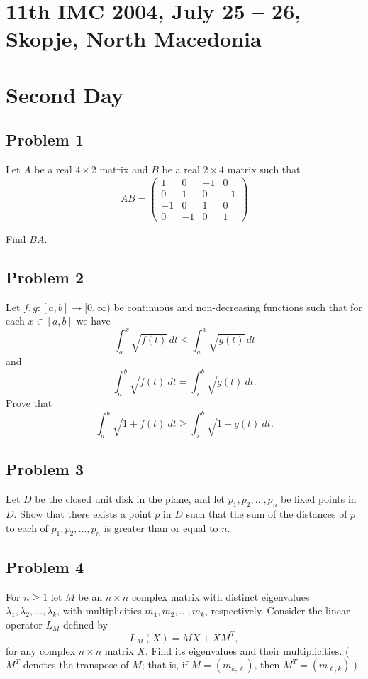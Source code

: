 \documentclass{article}
\begin{document}
\pagestyle{plain}

\section*{11th IMC 2004, July 25 -- 26, Skopje, North Macedonia}

\section*{Second Day}

\subsection*{Problem 1}
Let $A$ be a real $4 \times 2$ matrix and $B$ be a real $2 \times 4$ matrix such that
\[
AB = \begin{pmatrix}
1 & 0 & -1 & 0 \\
0 & 1 & 0 & -1 \\
-1 & 0 & 1 & 0 \\
0 & -1 & 0 & 1
\end{pmatrix}
\]

Find $BA$.

\subsection*{Problem 2}
Let $f, g \colon [a,b] \to [0, \infty)$ be continuous and non-decreasing functions
such that for each $x \in [a,b]$ we have
\[
\int_a^x \sqrt{f(t)}\,dt \leq \int_a^x \sqrt{g(t)}\,dt
\]
and
\[
\int_a^b \sqrt{f(t)}\,dt = \int_a^b \sqrt{g(t)}\,dt.
\]
Prove that
\[
\int_a^b \sqrt{1 + f(t)}\,dt \geq \int_a^b \sqrt{1 + g(t)}\,dt.
\]

\subsection*{Problem 3}
Let $D$ be the closed unit disk in the plane, and let $p_1, p_2, \ldots, p_n$ be fixed points in $D$.
Show that there exists a point $p$ in $D$ such that the sum of the distances of $p$
to each of $p_1, p_2, \ldots, p_n$ is greater than or equal to $n$.

\subsection*{Problem 4}
For $n \geq 1$ let $M$ be an $n \times n$ complex matrix with distinct eigenvalues
$\lambda_1, \lambda_2, \ldots, \lambda_k$, with multiplicities $m_1, m_2, \ldots, m_k$, respectively.
Consider the linear operator $L_M$ defined by
\[
L_M(X) = MX + X M^T,
\]
for any complex $n \times n$ matrix $X$. Find its eigenvalues and their multiplicities.
($M^T$ denotes the transpose of $M$; that is, if $M = (m_{k,\ell})$, then $M^T = (m_{\ell,k})$.)
\end{document}
